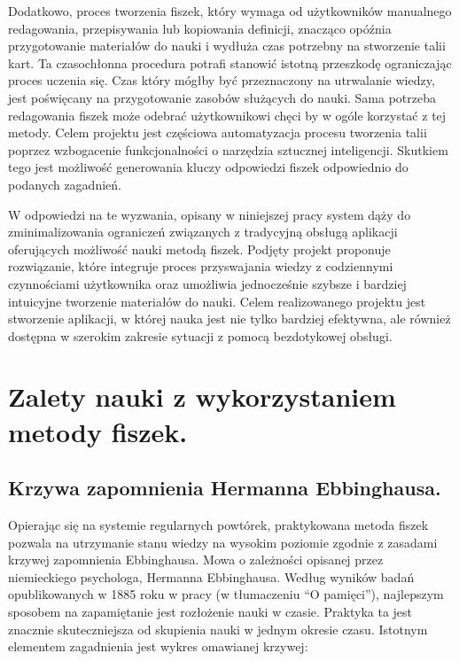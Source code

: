 Dodatkowo, proces tworzenia fiszek, który wymaga od użytkowników manualnego redagowania, przepisywania lub kopiowania definicji, znacząco opóźnia przygotowanie materiałów do nauki i wydłuża czas potrzebny na stworzenie talii kart. Ta czasochłonna procedura potrafi stanowić istotną przeszkodę ograniczając proces uczenia się. Czas który mógłby być przeznaczony na utrwalanie wiedzy, jest poświęcany na przygotowanie zasobów służących do nauki. Sama potrzeba redagowania fiszek może odebrać użytkownikowi chęci by w ogóle korzystać z tej metody. Celem projektu jest częściowa automatyzacja procesu tworzenia talii poprzez wzbogacenie funkcjonalności o narzędzia sztucznej inteligencji. Skutkiem tego jest możliwość generowania kluczy odpowiedzi fiszek odpowiednio do podanych zagadnień.

W odpowiedzi na te wyzwania, opisany w niniejszej pracy system dąży do zminimalizowania ograniczeń związanych z tradycyjną obsługą aplikacji oferujących możliwość nauki metodą fiszek. Podjęty projekt proponuje rozwiązanie, które integruje proces przyswajania wiedzy z codziennymi czynnościami użytkownika oraz umożliwia jednocześnie szybsze i bardziej intuicyjne tworzenie materiałów do nauki. Celem realizowanego projektu jest stworzenie aplikacji, w której nauka jest nie tylko bardziej efektywna, ale również dostępna w szerokim zakresie sytuacji z pomocą bezdotykowej obsługi.

\section{Zalety nauki z wykorzystaniem metody fiszek.}
\subsection{Krzywa zapomnienia Hermanna Ebbinghausa.}
Opierając się na systemie regularnych powtórek, praktykowana metoda fiszek pozwala na utrzymanie stanu wiedzy na wysokim poziomie zgodnie z zasadami krzywej zapomnienia Ebbinghausa. Mowa o zależności opisanej przez niemieckiego psychologa, Hermanna Ebbinghausa. Według wyników badań opublikowanych w 1885 roku w pracy \cite{Über das Gedächtnis} (w tłumaczeniu “O pamięci”), najlepszym sposobem na zapamiętanie jest rozłożenie nauki w czasie. Praktyka ta jest znacznie skuteczniejsza od skupienia nauki w jednym okresie czasu. Istotnym elementem zagadnienia jest wykres omawianej krzywej:

